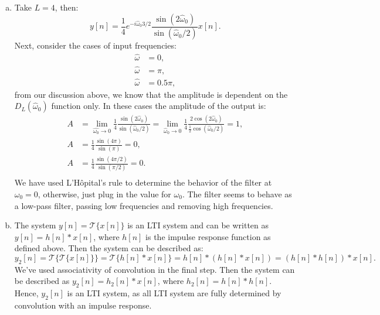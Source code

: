 \begin{enumerate}
\begin{enumerate}[a)]
\item Take $L=4$, then:
$$y[n]=\frac{1}{4}e^{-i\hat{\omega}_{0}3/2}\frac{\sin(2\hat{\omega}_{0})}{\sin(\hat{\omega}_{0}/2)}x[n].$$
Next, consider the cases of input frequencies:
\begin{align*}
    \hat{\omega}&=0,\\
    \hat{\omega}&=\pi,\\
    \hat{\omega}&=0.5\pi,
\end{align*}
from our discussion above, we know that the amplitude is dependent on the $D_{L}(\hat{\omega}_{0})$ function only. 
In these cases the amplitude of the output is:
\begin{align*}
    A&=\lim_{\hat{\omega_{0}}\to 0}\frac{1}{4}\frac{\sin(2\hat{\omega}_{0})}{\sin(\hat{\omega}_{0}/2)} = \lim_{\hat{\omega}_{0}\to 0}\frac{1}{4}\frac{2\cos(2\hat{\omega}_{0})}{\frac{1}{2}\cos(\hat{\omega}_{0}/2)} = 1, \\
    A&=\frac{1}{4}\frac{\sin(4\pi)}{\sin(\pi)} = 0,\\
    A&=\frac{1}{4}\frac{\sin(4\pi/2)}{\sin(\pi/2)} = 0.\\
\end{align*}
We have used L'Hôpital's rule to determine the behavior of the filter at $\omega_{0} = 0$, otherwise, just plug in the value for $\omega_0$. 
The filter seems to behave as a low-pass filter, passing low frequencies and removing high frequencies.  

\item The system $y[n]=\mathcal{T}\{x[n]\}$ is an LTI system and can be written as $y[n]=h[n]*x[n]$, where $h[n]$ is the impulse response function as defined above. 
Then the system can be described as:
$$y_{2}[n]=\mathcal{T}\{\mathcal{T}\{x[n]\}\}=\mathcal{T}\{h[n]*x[n]\}=h[n]*(h[n]*x[n])=(h[n]*h[n])*x[n].$$
We've used associativity of convolution in the final step. Then the system can be described as $y_{2}[n]=h_{2}[n]*x[n]$, 
where $h_{2}[n]=h[n]*h[n]$. Hence, $y_{2}[n]$ is an LTI system, as all LTI system are fully determined by convolution with an impulse response. 


\end{enumerate}
\end{enumerate}
